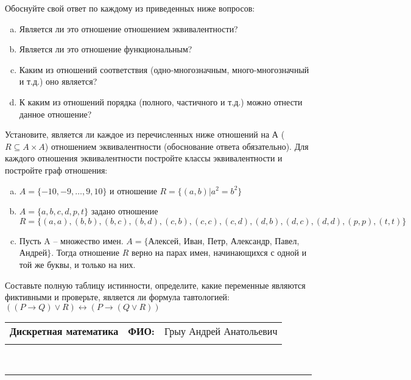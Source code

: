 \documentclass[10pt]{exam}
\newcommand{\class}{Дискретная математика}
\newcommand{\examdate}{}
\begin{document}
\begin{questions}
Обоснуйте свой ответ по каждому из приведенных ниже вопросов:
\begin{enumerate} [a)]\setcounter{enumi}{0}
    \item Является ли это отношение отношением эквивалентности?
    \item Является ли это отношение функциональным?
    \item Каким из отношений соответствия (одно-многозначным, много-многозначный и т.д.) оно является?
    \item К каким из отношений порядка (полного, частичного и т.д.) можно отнести данное отношение?
\end{enumerate}
\question
Установите, является ли каждое из перечисленных ниже отношений на А ($R \subseteq A \times A$) отношением эквивалентности (обоснование ответа обязательно). Для каждого отношения эквивалентности постройте классы 
эквивалентности и постройте граф отношения:
\begin{enumerate} [a)]\setcounter{enumi}{0}
\item $A = \{-10, -9, … , 9, 10\}$ и отношение $R = \{(a,b)|a^{2} = b^{2}\}$
\item $A = \{a, b, c, d, p, t\}$ задано отношение $R = \{(a, a), (b, b), (b, c), (b, d), (c, b), (c, c), (c, d), (d, b), (d, c), (d, d), (p,p), (t,t)\}$
\item Пусть A – множество имен. $A = \{ $Алексей, Иван, Петр, Александр, Павел, Андрей$ \}$. Тогда отношение $R$ верно на парах имен, начинающихся с одной и той же буквы, и только на них.
\end{enumerate}\question Составьте полную таблицу истинности, определите, какие переменные являются фиктивными и проверьте, является ли формула тавтологией:
$((P \rightarrow Q) \lor R) \leftrightarrow (P \rightarrow (Q \lor R))$

\end{questions}
\newpage
\begin{flushright}
\begin{tabular}{p{2.8in} r l}
\textbf{\class} & \textbf{ФИО:} &Грыу Андрей Анатольевич
\\

\textbf{\examdate} &&\\
\end{tabular}\\
\end{flushright}
\rule[1ex]{\textwidth}{.1pt}
\end{document}
